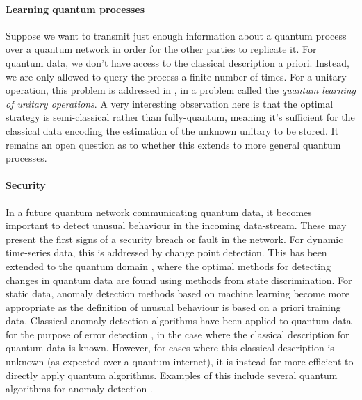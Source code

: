 \paragraph{Learning quantum processes}

Suppose we want to transmit just enough information about a quantum process over a quantum network in order for the other parties to replicate it. For quantum data, we don't have access to the classical description a priori. Instead, we are only allowed to query the process a finite number of times. For a unitary operation, this problem is addressed in \cite{bib:bisio_optimal_2010}, in a problem called the \textit{quantum learning of unitary operations}. A very interesting observation here is that the optimal strategy is semi-classical rather than fully-quantum, meaning it's sufficient for the classical data encoding the estimation of the unknown unitary to be stored. It remains an open question as to whether this extends to more general quantum processes.

\paragraph{Security}

In a future quantum network communicating quantum data, it becomes important to detect unusual behaviour in the incoming data-stream. These may present the first signs of a security breach or fault in the network. For dynamic time-series data, this is addressed by change point detection. This has been extended to the quantum domain \cite{bib:gael1, bib:gael2}, where the optimal methods for detecting changes in quantum data are found using methods from state discrimination. For static data, anomaly detection methods based on machine learning become more appropriate as the definition of unusual behaviour is based on a priori training data. Classical anomaly detection algorithms have been applied to quantum data for the purpose of error detection \cite{bib:sara}, in the case where the classical description for quantum data is known. However, for cases where this classical description is unknown (as expected over a quantum internet), it is instead far more efficient to directly apply quantum algorithms. Examples of this include several quantum algorithms for anomaly detection \cite{bib:liu2018quantum}.